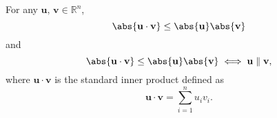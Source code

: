 \documentclass[a4paper,12pt]{article}
\begin{document}
For any \( \mathbf{u},\,\mathbf{v}\in\mathbb{R}^n \),
\[ \abs{\mathbf{u}\cdot\mathbf{v}}\leq\abs{\mathbf{u}}\abs{\mathbf{v}}\]
and
\[ \abs{\mathbf{u}\cdot\mathbf{v}}\leq\abs{\mathbf{u}}\abs{\mathbf{v}}\iff\mathbf{u}\parallel\mathbf{v}, \]
where \( \mathbf{u} \cdot \mathbf{v} \) is the standard inner product defined as
\[
\mathbf{u} \cdot \mathbf{v} = \sum_{i=1}^{n} u_i v_i.
\]
\end{document}

